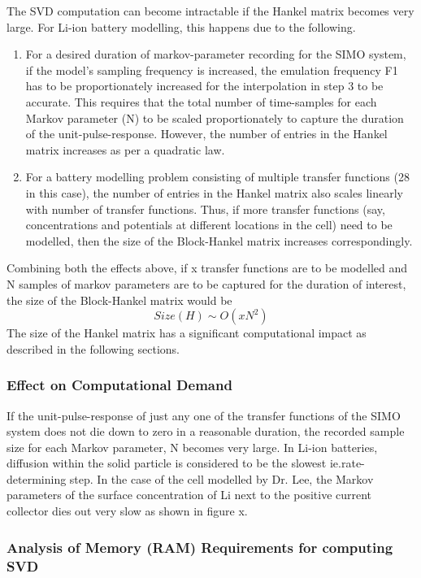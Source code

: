 The SVD  computation can become  intractable if  the Hankel matrix  becomes very
large.  For  Li-ion  battery  modelling,  this happens  due  to  the  following.
\begin{enumerate} \item For a desired duration of markov-parameter recording for
the SIMO system,  if the model's sampling frequency is  increased, the emulation
frequency F1 has to be proportionately increased for the interpolation in step 3
to be  accurate. This requires  that the total  number of time-samples  for each
Markov parameter (N) to be scaled proportionately to capture the duration of the
unit-pulse-response.  However,  the  number  of entries  in  the  Hankel  matrix
increases  as  per a  quadratic  law.  \item  For  a battery  modelling  problem
consisting  of multiple  transfer functions  (28 in  this case),  the number  of
entries  in the  Hankel  matrix also  scales linearly  with  number of  transfer
functions. Thus, if more transfer  functions (say, concentrations and potentials
at different locations  in the cell) need  to be modelled, then the  size of the
Block-Hankel  matrix increases  correspondingly. \end{enumerate}  Combining both
the effects above, if  x transfer functions are to be modelled  and N samples of
markov parameters are to  be captured for the duration of  interest, the size of
the Block-Hankel matrix would be
\[
Size(H)\sim O(xN^{2})
\]
The  size  of the  Hankel  matrix  has  a  significant computational  impact  as
described in the following sections.

\subsubsection{Effect on Computational Demand}

If the unit-pulse-response of just any one of the transfer functions of the SIMO
system  does  not die  down  to  zero in  a  reasonable  duration, the  recorded
sample  size  for  each  Markov  parameter, N  becomes  very  large.  In  Li-ion
batteries, diffusion within  the solid particle is considered to  be the slowest
ie.rate-determining  step. In  the case  of the  cell modelled  by Dr.  Lee, the
Markov  parameters of  the  surface concentration  of Li  next  to the  positive
current collector dies out very slow as shown in figure x.

\subsubsection*{Analysis of Memory (RAM) Requirements for computing SVD}

